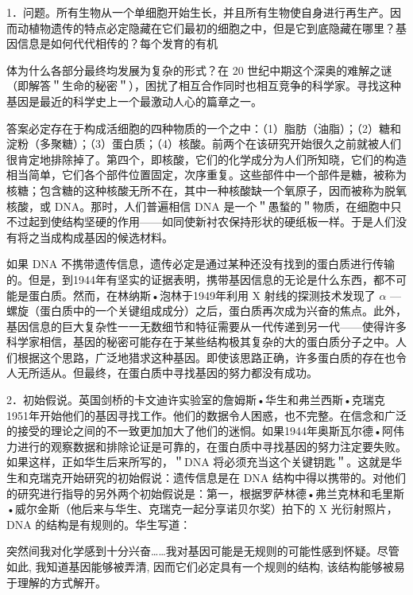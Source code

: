 1．问题。所有生物从一个单细胞开始生长，并且所有生物使自身进行再生产。因而动植物遗传的特点必定隐藏在它们最初的细胞之中，但是它到底隐藏在哪里？基因信息是如何代代相传的？每个发育的有机

体为什么各部分最终均发展为复杂的形式？在 20 世纪中期这个深奥的难解之谜（即解答＂生命的秘密＂），困扰了相互合作同时也相互竞争的科学家。寻找这种基因是最近的科学史上一个最激动人心的篇章之一。

答案必定存在于构成活细胞的四种物质的一个之中：（1）脂肪（油脂）；（2）糖和淀粉（多聚糖）；（3）蛋白质；（4）核酸。前两个在该研究开始很久之前就被人们很肯定地排除掉了。第四个，即核酸，它们的化学成分为人们所知晓，它们的构造相当简单，它们各个部件位置固定，次序重复。这些部件中一个部件是糖，被称为核糖；包含糖的这种核酸无所不在，其中一种核酸缺一个氧原子，因而被称为脱氧核酸，或 DNA。那时，人们普遍相信 DNA 是一个＂愚蝵的＂物质，在细胞中只不过起到使结构坚硬的作用——如同使新衬农保持形状的硬纸板一样。于是人们没有将之当成构成基因的候选材料。

如果 DNA 不携带遗传信息，遗传必定是通过某种还没有找到的蛋白质进行传输的。但是，到1944年有坚实的证据表明，携带基因信息的无论是什么东西，都不可能是蛋白质。然而，在林纳斯•泡林于1949年利用 X 射线的探测技术发现了 $\alpha$ —螺旋（蛋白质中的一个关键组成成分）之后，蛋白质再次成为兴奋的焦点。此外，基因信息的巨大复杂性一一无数细节和特征需要从一代传递到另一代——使得许多科学家相信，基因的秘密可能存在于某些结构极其复杂的大的蛋白质分子之中。人们根据这个思路，广泛地猎求这种基因。即使该思路正确，许多蛋白质的存在也令人无所适从。但最终，在蛋白质中寻找基因的努力都没有成功。

2．初始假说。英国剑桥的卡文迪许实验室的詹姆斯•华生和弗兰西斯•克瑞克1951年开始他们的基因寻找工作。他们的数据令人困惑，也不完整。在信念和广泛的接受的理论之间的不一致更加加大了他们的迷恫。如果1944年奥斯瓦尔德•阿伟力进行的观察数据和排除论证是可靠的，在蛋白质中寻找基因的努力注定要失败。如果这样，正如华生后来所写的，＂DNA 将必须充当这个关键钥匙＂\cite{watson1968b}。这就是华生和克瑞克开始研究的初始假说：遗传信息是在 DNA 结构中得以携带的。对他们的研究进行指导的另外两个初始假说是：第一，根据罗萨林德•弗兰克林和毛里斯•威尔金斯（他后来与华生、克瑞克一起分享诺贝尔奖）拍下的 X 光衍射照片，DNA 的结构是有规则的。华生写道：

\begin{displayquote}
突然间我对化学感到十分兴奋……我对基因可能是无规则的可能性感到怀疑。尽管如此, 我知道基因能够被弄清, 因而它们必定具有一个规则的结构, 该结构能够被易于理解的方式解开。\cite{watson1968c}
\end{displayquote}

